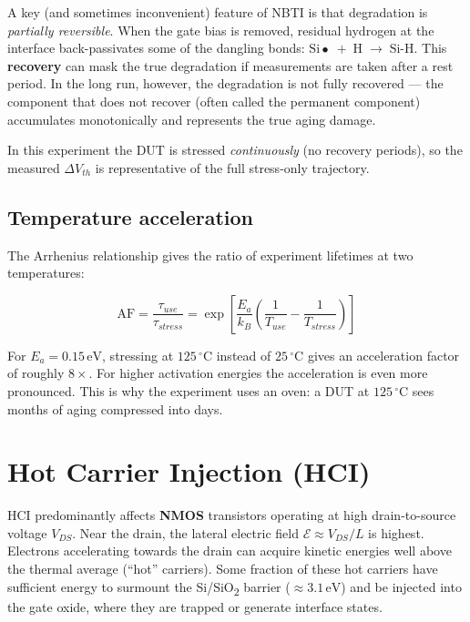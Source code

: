 \documentclass[12pt, a4paper]{report}
\begin{document}
A key (and sometimes inconvenient) feature of NBTI is that degradation is
\emph{partially reversible}. When the gate bias is removed, residual hydrogen
at the interface back-passivates some of the dangling bonds:
$\text{Si}\bullet \;+\; \text{H} \;\rightarrow\; \text{Si-H}$.
This \textbf{recovery} can mask the true degradation if measurements are taken
after a rest period. In the long run, however, the degradation is not fully
recovered --- the component that does not recover (often called the permanent
component) accumulates monotonically and represents the true aging damage.

In this experiment the DUT is stressed \emph{continuously} (no recovery periods),
so the measured $\Delta V_{th}$ is representative of the full stress-only trajectory.

\subsection{Temperature acceleration}

The Arrhenius relationship gives the ratio of experiment lifetimes at two temperatures:

\begin{equation}
  \text{AF} = \frac{\tau_{use}}{\tau_{stress}} =
  \exp\!\left[\frac{E_a}{k_B}\left(\frac{1}{T_{use}} - \frac{1}{T_{stress}}\right)\right]
\end{equation}

For $E_a = 0.15\,\text{eV}$, stressing at $125\,^\circ\text{C}$ instead of $25\,^\circ\text{C}$
gives an acceleration factor of roughly $8\times$. For higher activation energies the
acceleration is even more pronounced. This is why the experiment uses an oven: a DUT
at $125\,^\circ\text{C}$ sees months of aging compressed into days.

\section{Hot Carrier Injection (HCI)}

HCI predominantly affects \textbf{NMOS} transistors operating at high drain-to-source
voltage $V_{DS}$. Near the drain, the lateral electric field $\mathcal{E} \approx V_{DS}/L$
is highest. Electrons accelerating towards the drain can acquire kinetic energies
well above the thermal average (``hot'' carriers). Some fraction of these hot carriers
have sufficient energy to surmount the Si/SiO\textsubscript{2} barrier ($\approx 3.1\,\text{eV}$)
and be injected into the gate oxide, where they are trapped or generate interface states.
\end{document}
